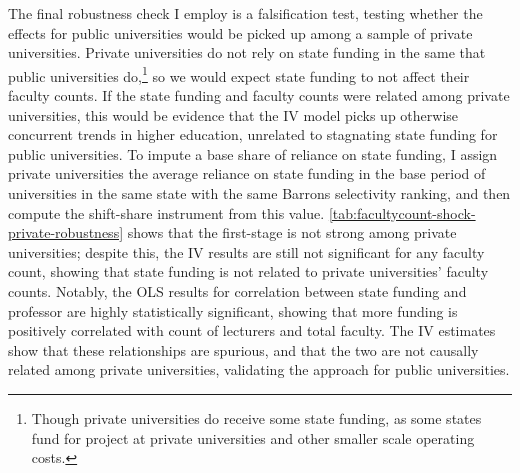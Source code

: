 The final robustness check I employ is a falsification test, testing whether the effects for public universities would be picked up among a sample of private universities.
Private universities do not rely on state funding in the same that public universities do,\footnote{
    Though private universities do receive some state funding, as some states fund for project at private universities and other smaller scale operating costs.
}
so we would expect state funding to not affect their faculty counts.
If the state funding and faculty counts were related among private universities, this would be evidence that the IV model picks up otherwise concurrent trends in higher education, unrelated to stagnating state funding for public universities.
To impute a base share of reliance on state funding, I assign private universities the average reliance on state funding in the base period of universities in the same state with the same Barrons selectivity ranking, and then compute the shift-share instrument from this value.
\autoref{tab:facultycount-shock-private-robustness} shows that the first-stage is not strong among private universities; despite this, the IV results are still not significant for any faculty count, showing that state funding is not related to private universities' faculty counts.
Notably, the OLS results for correlation between state funding and professor are highly statistically significant, showing that more funding is positively correlated with count of lecturers and total faculty.
The IV estimates show that these relationships are spurious, and that the two are not causally related among private universities, validating the approach for public universities.
